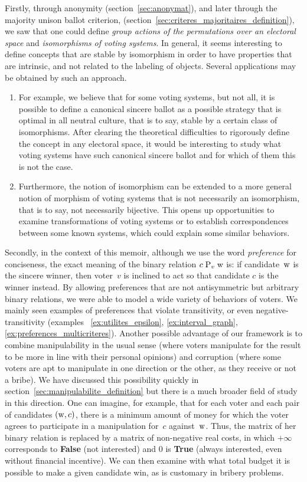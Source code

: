 Firstly, through anonymity (section~\ref{sec:anonymat}), and later through the majority unison ballot criterion, \bulmajuni{} (section~\ref{sec:criteres_majoritaires_definition}), we saw that one could define \emph{group actions of the permutations over an electoral space} and \emph{isomorphisms of voting systems}. In general, it seems interesting to define concepts that are stable by isomorphism in order to have properties that are intrinsic, and not related to the labeling of objects. Several applications may be obtained by such an approach.
\begin{enumerate}
\item For example, we believe that for some voting systems, but not all, it is possible to define a canonical sincere ballot as a possible strategy that is optimal in all neutral culture, that is to say, stable by a certain class of isomorphisms. After clearing the theoretical difficulties to rigorously define the concept in any electoral space, it would be interesting to study what voting systems have such canonical sincere ballot and for which of them this is not the case.
\item Furthermore, the notion of isomorphism can be extended to a more general notion of morphism of voting systems that is not necessarily an isomorphism, that is to say, not necessarily bijective. This opens up opportunities to examine transformations of voting systems or to establish correspondences between some known systems, which could explain some similar behaviors.
\end{enumerate}

Secondly, in the context of this memoir, although we use the word \emph{preference} for conciseness, the exact meaning of the binary relation $c \mathrel{\textrm{\normalfont P}_{v}} \mathrm{w}$ is: if candidate~$\mathrm{w}$ is the sincere winner, then voter~$ v $ is inclined to act so that candidate $ c $ is the winner instead. By allowing preferences that are not antisymmetric but arbitrary binary relations, we were able to model a wide variety of behaviors of voters.
We mainly seen examples of preferences that violate transitivity, or even negative-transitivity (examples ~\ref{ex:utilites_epsilon}, \ref{ex:interval_graph}, \ref{ex:preferences_multicriteres}). Another possible advantage of our framework is to combine manipulability in the usual sense (where voters manipulate for the result to be more in line with their personal opinions) and corruption (where some voters are apt to manipulate in one direction or the other, as they receive or not a bribe). We have discussed this possibility quickly in section~\ref{sec:manipulabilite_definition} but there is a much broader field of study in this direction. One can imagine, for example, that for each voter and each pair of candidates $ (\mathrm{w}, c) $, there is a minimum amount of money for which the voter agrees to participate in a manipulation for~$ c $ against~$\mathrm{w}$.
Thus, the matrix of her binary relation is replaced by a matrix of non-negative real costs, in which $ +\infty $ corresponds to \textbf{False} (not interested) and 0 is \textbf{True} (always interested, even without financial incentive).
We can then examine with what total budget it is possible to make a given candidate win, as is customary in bribery problems.

